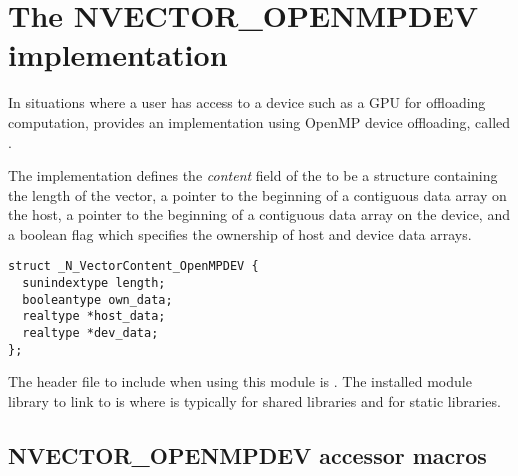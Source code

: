 \section{The NVECTOR\_OPENMPDEV implementation}\label{ss:nvec_openmpdev}

In situations where a user has access to a device such as a GPU for
offloading computation, {\sundials} provides an {\nvector} implementation using
OpenMP device offloading, called {\nvecopenmpdev}.

The {\nvecopenmpdev} implementation defines the \textit{content} field
of the  to be a structure  containing the length of the vector, a pointer
to the beginning of a contiguous  data array on the host, a pointer to the beginning of
a contiguous data array on the device, and a boolean flag  which specifies
the ownership of host and device data arrays.
\begin{verbatim} 
struct _N_VectorContent_OpenMPDEV {
  sunindextype length;
  booleantype own_data;
  realtype *host_data;
  realtype *dev_data;
};
\end{verbatim}

The header file to include when using this module is .
The installed module library to link to is
where  is typically  for shared libraries and 
for static libraries.


\subsection{NVECTOR\_OPENMPDEV accessor macros}
\label{ss:nvec_openmpdev_macros}

